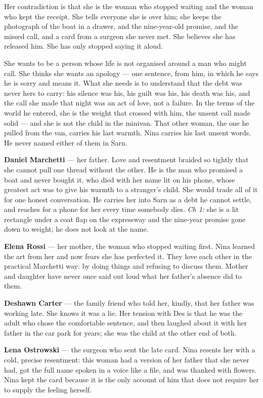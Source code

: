 \documentclass{design/chronicle}
\begin{document}
{Her contradiction is that she is the woman who stopped waiting and the woman who kept the receipt. She tells everyone she is over him; she keeps the photograph of the boat in a drawer, and the nine-year-old promise, and the missed call, and a card from a surgeon she never met. She believes she has released him. She has only stopped saying it aloud.

She wants to be a person whose life is not organised around a man who might call. She thinks she wants an apology — one sentence, from him, in which he says he is sorry and means it. What she needs is to understand that the debt was never hers to carry: his silence was his, his guilt was his, his death was his, and the call she made that night was an act of love, not a failure. In the terms of the world he entered, she is the weight that crossed with him, the unsent call made solid — and she is not the child in the minivan. That other woman, the one he pulled from the van, carries his last warmth. Nina carries his last unsent words. He never named either of them in Sarn.

\textbf{Daniel Marchetti} — her father. Love and resentment braided so tightly that she cannot pull one thread without the other. He is the man who promised a boat and never bought it, who died with her name lit on his phone, whose greatest act was to give his warmth to a stranger’s child. She would trade all of it for one honest conversation. He carries her into Sarn as a debt he cannot settle, and reaches for a phone for her every time somebody dies. \emph{Ch 1:} she is a lit rectangle under a coat flap on the expressway and the nine-year promise gone down to weight; he does not look at the name.

\textbf{Elena Rossi} — her mother, the woman who stopped waiting first. Nina learned the art from her and now fears she has perfected it. They love each other in the practical Marchetti way: by doing things and refusing to discuss them. Mother and daughter have never once said out loud what her father’s absence did to them.

\textbf{Deshawn Carter} — the family friend who told her, kindly, that her father was working late. She knows it was a lie. Her tension with Des is that he was the adult who chose the comfortable sentence, and then laughed about it with her father in the car park for years; she was the child at the other end of both.

\textbf{Lena Ostrowski} — the surgeon who sent the late card. Nina resents her with a cold, precise resentment: this woman had a version of her father that she never had, got the full name spoken in a voice like a file, and was thanked with flowers. Nina kept the card because it is the only account of him that does not require her to supply the feeling herself.

}
\end{document}
